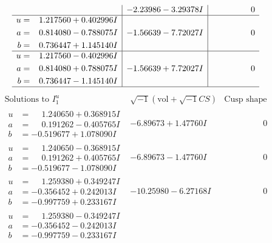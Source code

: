 \documentclass[1p]{elsarticle_modified}
\theoremstyle{definition}
\newcommand{\I}{\sqrt{-1}}
\begin{document}
$$\begin{array}{c|c|c}
 & -2.23986 - 3.29378 I & \phantom{-0.000000 } 0 \\ \hline\begin{aligned}
u &= \phantom{-}1.217560 + 0.402996 I \\
a &= \phantom{-}0.814080 - 0.788075 I \\
b &= \phantom{-}0.736447 + 1.145140 I\end{aligned}
 & -1.56639 - 7.72027 I & \phantom{-0.000000 } 0 \\ \hline\begin{aligned}
u &= \phantom{-}1.217560 - 0.402996 I \\
a &= \phantom{-}0.814080 + 0.788075 I \\
b &= \phantom{-}0.736447 - 1.145140 I\end{aligned}
 & -1.56639 + 7.72027 I & \phantom{-0.000000 } 0\\
 \hline 
 \end{array}$$\newpage$$\begin{array}{c|c|c}  
\text{Solutions to }I^u_{1}& \I (\text{vol} + \sqrt{-1}CS) & \text{Cusp shape}\\
 \hline 
\begin{aligned}
u &= \phantom{-}1.240650 + 0.368915 I \\
a &= \phantom{-}0.191262 - 0.405765 I \\
b &= -0.519677 + 1.078090 I\end{aligned}
 & -6.89673 + 1.47760 I & \phantom{-0.000000 } 0 \\ \hline\begin{aligned}
u &= \phantom{-}1.240650 - 0.368915 I \\
a &= \phantom{-}0.191262 + 0.405765 I \\
b &= -0.519677 - 1.078090 I\end{aligned}
 & -6.89673 - 1.47760 I & \phantom{-0.000000 } 0 \\ \hline\begin{aligned}
u &= \phantom{-}1.259380 + 0.349247 I \\
a &= -0.356452 + 0.242013 I \\
b &= -0.997759 + 0.233167 I\end{aligned}
 & -10.25980 - 6.27168 I & \phantom{-0.000000 } 0 \\ \hline\begin{aligned}
u &= \phantom{-}1.259380 - 0.349247 I \\
a &= -0.356452 - 0.242013 I \\
b &= -0.997759 - 0.233167 I\end{aligned}

\end{array}$$
\end{document}
